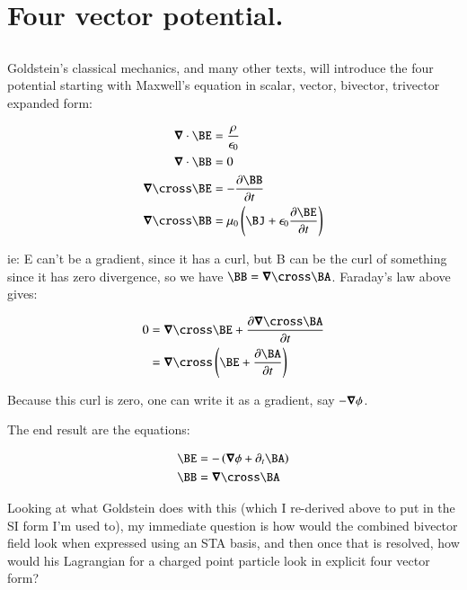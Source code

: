 \chapter{Four vector potential.} 

\section{}

Goldstein's classical mechanics, and many other texts, will introduce the four potential starting with 
Maxwell's equation in scalar, vector, bivector, trivector expanded form:

\begin{align*}
\spacegrad \cdot \BE &= \frac{\rho}{\epsilon_0} \\
\spacegrad \cdot \BB &= 0 \\
\spacegrad \cross \BE &= - \frac{\partial \BB}{\partial t} \\
\spacegrad \cross \BB &= \mu_0\left(\BJ + \epsilon_0 \frac{\partial \BE}{\partial t}\right) \\
\end{align*}

ie: E can't be a gradient, since it has a curl, but B can be the curl of something since it has zero
divergence, so we have $\BB = \spacegrad \cross \BA$.  Faraday's law above gives:

\begin{align*}
0 &= \spacegrad \cross \BE + \frac{\partial \spacegrad \cross \BA}{\partial t} \\
&= \spacegrad \cross \left(\BE + \frac{\partial \BA}{\partial t}\right) \\
\end{align*}

Because this curl is zero, one can write it as a gradient, say $-\boldsymbol{\nabla} \phi$.

The end result are the equations:

\begin{align}
\BE &= - \left( \spacegrad \phi + \partial_t \BA \right) \label{eqn:fourPot:BE} \\
\BB &= \spacegrad \cross \BA \label{eqn:fourPot:BB} 
\end{align}

Looking at what Goldstein does with this (which I re-derived above to put in the SI form I'm used to), my
immediate question is how would the combined bivector field look when expressed using an STA basis, and 
then once that is resolved, how would his Lagrangian for a charged point particle look in explicit four
vector form?

